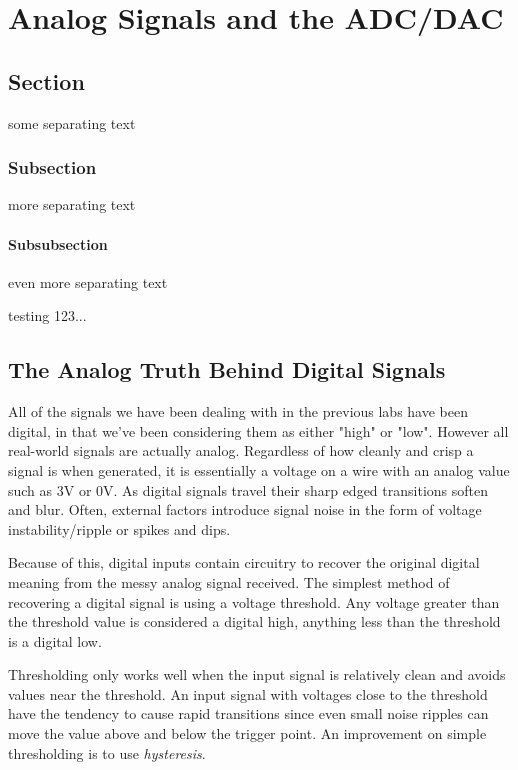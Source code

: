 \documentclass[11pt,fleqn]{book} %
\begin{document}
	
\chapter{Analog Signals and the ADC/DAC}



\section{Section}
some separating text
\subsection{Subsection}
more separating text
\subsubsection{Subsubsection}
even more separating text

\begin{problem}
    testing 123...
\end{problem}

\section{The Analog Truth Behind Digital Signals}
All of the signals we have been dealing with in the previous labs have been digital, in that we've been considering them as either "high" or "low". However all real-world signals are actually analog. Regardless of how cleanly and crisp a signal is when generated, it is essentially a voltage on a wire with an analog value such as 3V or 0V. As digital signals travel their sharp edged transitions soften and blur. Often, external factors introduce signal noise in the form of voltage instability/ripple or spikes and dips.

Because of this, digital inputs contain circuitry to recover the original digital meaning from the messy analog signal received. The simplest method of recovering a digital signal is using a voltage threshold. Any voltage greater than the threshold value is considered a digital high, anything less than the threshold is a digital low. 

Thresholding only works well when the input signal is relatively clean and avoids values near the threshold. An input signal with voltages close to the threshold have the tendency to cause rapid transitions since even small noise ripples can move the value above and below the trigger point. An improvement on simple thresholding is to use \textit{hysteresis}. 
\end{document}
